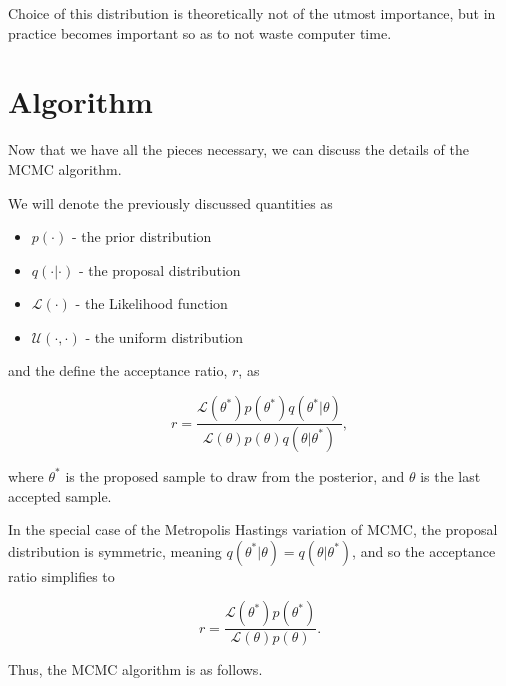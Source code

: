 \documentclass[12pt]{article}
\begin{document}
    Choice of this distribution is theoretically not of the utmost importance, but in practice becomes important so as to not waste computer time.


\section{Algorithm}

    Now that we have all the pieces necessary, we can discuss the details of the MCMC algorithm.

    We will denote the previously discussed quantities as

    \begin{itemize}
        \item $p(\cdot)$ - the prior distribution
        \item $q(\cdot|\cdot)$ - the proposal distribution
        \item $\mathcal{L}(\cdot)$ - the Likelihood function
        \item $\mathcal{U}(\cdot,\cdot)$ - the uniform distribution
    \end{itemize}

    and the define the acceptance ratio, $r$, as

    $$
        r = \frac{\mathcal{L}(\theta^*)p(\theta^*)q(\theta^*|\theta)}{\mathcal{L}(\theta)p(\theta)q(\theta|\theta^*)},
    $$

    where $\theta^*$ is the proposed sample to draw from the posterior, and $\theta$ is the last accepted sample.

    In the special case of the Metropolis Hastings variation of MCMC, the proposal distribution is symmetric, meaning $q(\theta^*|\theta) = q(\theta|\theta^*)$, and so the acceptance ratio simplifies to

    $$
        r = \frac{\mathcal{L}(\theta^*)p(\theta^*)}{\mathcal{L}(\theta)p(\theta)}.
    $$

    Thus, the MCMC algorithm is as follows.
\end{document}
